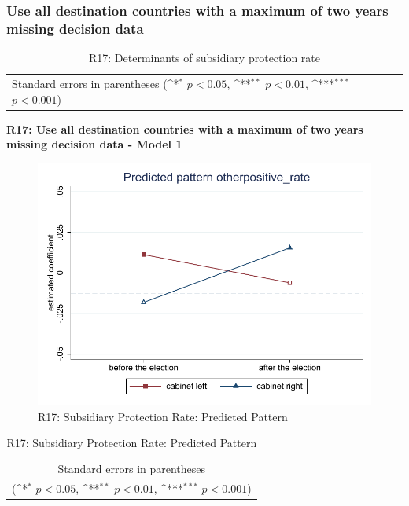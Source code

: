 \documentclass[10pt,a4paper]{scrartcl}
\begin{document}


\clearpage
\FloatBarrier
\subsubsection{Use all destination countries with a maximum of two years missing decision data}
\begin{table}[!ht]\centering
	\renewcommand{\arraystretch}{1.25}
	\small
	\def\sym#1{\ifmmode^{#1}\else\(^{#1}\)\fi}
	\caption{R17: Determinants of subsidiary protection rate}
	\begin{tabular}{l*{3}{c}}
		\hline\hline
		
		\hline\hline
		\multicolumn{4}{l}{\footnotesize Standard errors in parentheses (\sym{*} \(p<0.05\), \sym{**} \(p<0.01\), \sym{***} \(p<0.001\))}\\
	\end{tabular}
\end{table}

\clearpage
\textbf{R17: Use all destination countries with a maximum of two years missing decision data - Model 1}
\begin{figure}[!ht]
	\centering
	\includegraphics[width=1\textwidth]{figures_edited/otherpositive_rate_graph1_R17.pdf}
	\caption{R17: Subsidiary Protection Rate: Predicted Pattern}
\end{figure}

\begin{table}[!ht]\centering
	\renewcommand{\arraystretch}{1.25}
	\def\sym#1{\ifmmode^{#1}\else\(^{#1}\)\fi}
	\caption{R17: Subsidiary Protection Rate: Predicted Pattern}
	\begin{tabular}{l*{2}{c}}
		\hline\hline
		
		\hline\hline
		\multicolumn{3}{c}{\footnotesize Standard errors in parentheses} \\
		\multicolumn{3}{c}{\footnotesize (\sym{*} \(p<0.05\), \sym{**} \(p<0.01\), \sym{***} \(p<0.001\))}\\
	\end{tabular}
\end{table}
\end{document}
